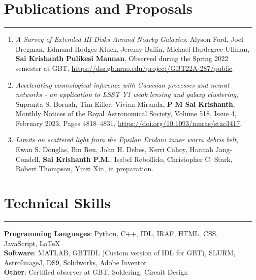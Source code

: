 \documentclass[11pt]{article}
\newcommand{\resumesection}[1]{\vspace{-0.2cm}\section*{#1}\vspace{-0.2cm}\hrule\vspace{0.2cm}}
\begin{document}
\resumesection{Publications and Proposals}

\begin{enumerate}
	\item \textit{A Survey of Extended HI Disks Around Nearby Galaxies}, Alyson Ford, Joel Bregman, Edmund Hodges-Kluck, Jeremy Bailin, Michael Hardegree-Ullman, \textbf{Sai Krishanth Pulikesi Mannan}, Observed during the Spring 2022 semester at GBT, \url{https://dss.gb.nrao.edu/project/GBT22A-287/public}. 
	\item \textit{Accelerating cosmological inference with Gaussian processes and neural
	networks - an application to LSST Y1 weak lensing and galaxy clustering}, Supranta S. Boruah, Tim Eifler, Vivian Miranda, \textbf{P M Sai Krishanth}, Monthly Notices of the Royal Astronomical Society, Volume 518, Issue 4, February 2023, Pages 4818–4831, \url{https://doi.org/10.1093/mnras/stac3417}. 
	\item \textit{Limits on scattered light from the Epsilon Eridani inner warm debris belt}, Ewan S. Douglas, Bin Ren, John H. Debes, Kerri Cahoy, Hannah Jang-Condell, \textbf{Sai Krishanth P.M.},
	Isabel Rebollido, Christopher C. Stark, Robert Thompson, Yinzi Xin, in preparation. 
\end{enumerate}

\resumesection{Technical Skills}

\textbf{Programming Languages}: Python, C++, IDL, IRAF, HTML, CSS, JavaScript, \LaTeX 
\\
\textbf{Software}: MATLAB, GBTIDL (Custom version of IDL for GBT), SLURM, AstroImageJ, DS9, Solidworks, Adobe Inventor
\\
\textbf{Other}: Certified observer at GBT, Soldering, Circuit Design
\end{document}
